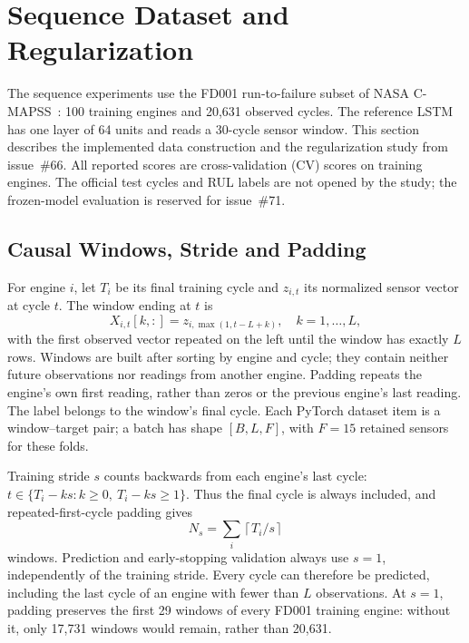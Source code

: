
\section{Sequence Dataset and Regularization}
\label{sec:dl_dataset}

The sequence experiments use the FD001 run-to-failure subset of NASA
C-MAPSS~\cite{Saxena2008damage}: 100 training engines and 20,631 observed
cycles. The reference LSTM~\cite{Hochreiter1997long} has one layer of 64 units
and reads a 30-cycle sensor window. This section describes the implemented
data construction and the regularization study from issue~\#66. All reported
scores are cross-validation (CV) scores on training engines. The official
test cycles and RUL labels are not opened by the study; the frozen-model
evaluation is reserved for issue~\#71.

\subsection{Causal Windows, Stride and Padding}
For engine $i$, let $T_i$ be its final training cycle and $z_{i,t}$ its
normalized sensor vector at cycle $t$. The window ending at $t$ is
\begin{equation}
 X_{i,t}[k,:]=z_{i,\max(1,t-L+k)},\quad k=1,\ldots,L,
\end{equation}
with the first observed vector repeated on the left until the window has
exactly $L$ rows. Windows are built after sorting by engine and cycle;
they contain neither future observations nor readings from another engine.
Padding repeats the engine's own first reading, rather than zeros or the
previous engine's last reading. The label belongs to the window's final
cycle. Each PyTorch dataset item is a window--target pair; a batch has shape
$[B,L,F]$, with $F=15$ retained sensors for these folds.

Training stride $s$ counts backwards from each engine's last cycle:
$t\in\{T_i-ks:k\geq0,\ T_i-ks\geq1\}$. Thus the final cycle is always
included, and repeated-first-cycle padding gives
\begin{equation}
 N_s=\sum_i\left\lceil T_i/s\right\rceil
\end{equation}
windows. Prediction and early-stopping validation always use $s=1$,
independently of the training stride. Every cycle can therefore be predicted,
including the last cycle of an engine with fewer than $L$ observations.
At $s=1$, padding preserves the first 29 windows of every FD001 training
engine: without it, only 17,731 windows would remain, rather than 20,631.

